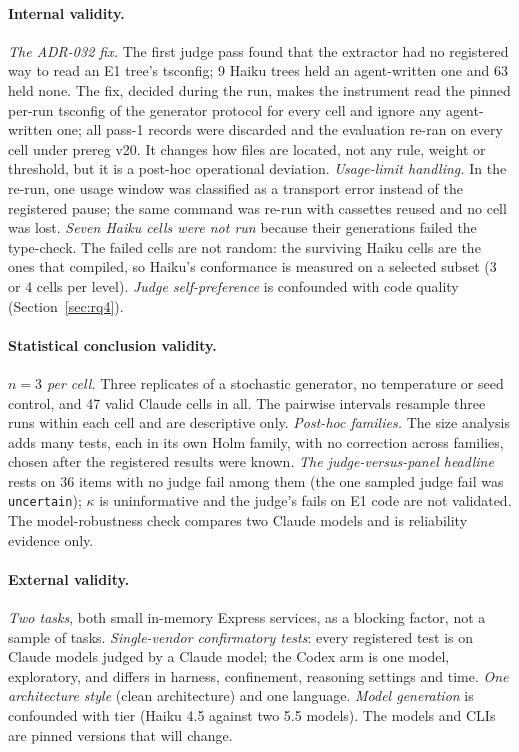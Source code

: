 \documentclass[10pt,a4paper]{article}
\begin{document}
\paragraph{Internal validity.}
\emph{The ADR-032 fix.} The first judge pass found that the extractor had no registered way to read an E1 tree's
tsconfig; 9 Haiku trees held an agent-written one and 63 held none. The fix, decided during the run, makes the
instrument read the pinned per-run tsconfig of the generator protocol for every cell and ignore any agent-written one;
all pass-1 records were discarded and the evaluation re-ran on every cell under prereg v20. It changes how files are
located, not any rule, weight or threshold, but it is a post-hoc operational deviation.
\emph{Usage-limit handling.} In the re-run, one usage window was classified as a transport error instead of the
registered pause; the same command was re-run with cassettes reused and no cell was lost.
\emph{Seven Haiku cells were not run} because their generations failed the type-check. The failed cells are not
random: the surviving Haiku cells are the ones that compiled, so Haiku's conformance is measured on a selected
subset (3 or 4 cells per level). %
\emph{Judge self-preference} is confounded with code quality (Section~\ref{sec:rq4}).

\paragraph{Statistical conclusion validity.}
\emph{$n = 3$ per cell.} Three replicates of a stochastic generator, no temperature or seed control, and 47 valid
Claude cells in all. The pairwise intervals resample three runs within each cell and are descriptive only.
\emph{Post-hoc families.} The size analysis adds many tests, each in its own Holm family, with no correction across
families, chosen after the registered results were known. %
\emph{The judge-versus-panel headline} rests on 36 items with no judge fail among them (the one sampled judge fail
was \texttt{uncertain}); $\kappa$ is uninformative and
the judge's fails on E1 code are not validated. The model-robustness check compares two Claude models and is
reliability evidence only.

\paragraph{External validity.}
\emph{Two tasks}, both small in-memory Express services, as a blocking factor, not a sample of tasks.
\emph{Single-vendor confirmatory tests}: every registered test is on Claude models judged by a Claude model; the
Codex arm is one model, exploratory, and differs in harness, confinement, reasoning settings and time.
\emph{One architecture style} (clean architecture) and one language. \emph{Model generation} is confounded with tier
(Haiku 4.5 against two 5.5 models). %
The models and CLIs are pinned versions that will change.
\end{document}

